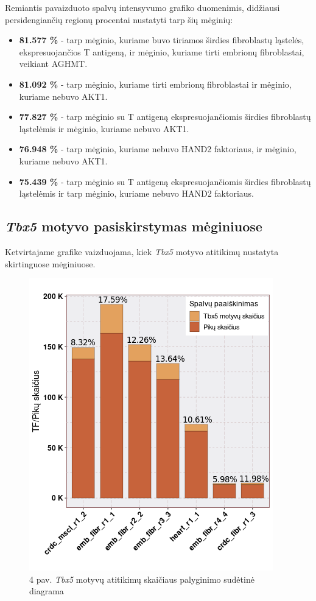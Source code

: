 \documentclass[12pt]{article}
\begin{document}
Remiantis pavaizduoto spalvų intensyvumo grafiko duomenimis,
didžiausi persidengiančių regionų procentai nustatyti tarp
šių mėginių:
\begin{itemize}
    \item \textbf{81.577 \%} - tarp mėginio, kuriame buvo tiriamos širdies
            fibroblastų ląstelės, ekspresuojančios T antigeną, ir mėginio,
            kuriame tirti embrionų fibroblastai, veikiant AGHMT.
    \item \textbf{81.092 \%} - tarp mėginio, kuriame tirti embrionų
            fibroblastai ir mėginio, kuriame nebuvo AKT1.
    \item \textbf{77.827 \%} - tarp mėginio su T antigeną ekspresuojančiomis
            širdies fibroblastų ląstelėmis ir mėginio, kuriame nebuvo AKT1.
    \item \textbf{76.948 \%} - tarp mėginio, kuriame nebuvo HAND2
            faktoriaus, ir mėginio, kuriame nebuvo AKT1.
    \item \textbf{75.439 \%} - tarp mėginio su T antigeną ekspresuojančiomis
            širdies fibroblastų ląstelėmis ir tarp mėginio, kuriame nebuvo HAND2
            faktoriaus.
  \end{itemize}

\subsection{\emph{Tbx5} motyvo pasiskirstymas mėginiuose}
Ketvirtajame grafike vaizduojama, kiek \emph{Tbx5}
motyvo atitikimų nustatyta skirtinguose mėginiuose.

\begin{figure}[htb]
    \begin{center}
        \includegraphics[width=0.7\linewidth]{Figures/tf_hit_percentage.png}
        \caption*{4 pav. \emph{Tbx5} motyvų atitikimų skaičiaus palyginimo
                  sudėtinė diagrama}
    \end{center}
\end{figure}
\end{document}
